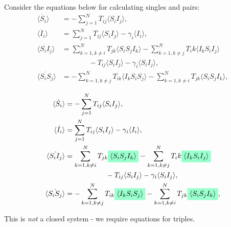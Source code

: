 \documentclass[unknownkeysallowed]{beamer}
\newcommand{\highlight}[1]{%
  \colorbox{highlight-colour}{$\displaystyle#1$}}
\begin{document}

\begin{frame}

Consider the equations below for calculating singles and pairs:
\begin{align*}
\langle \dot{S_i} \rangle & = -\sum^N_{j=1}T_{ij}\langle S_iI_j\rangle,\\
\langle\dot{I_i}\rangle & = \sum^N_{j=1}T_{ij}\langle S_iI_j\rangle - \gamma_i\langle I_i \rangle,\\
\langle\dot{S_iI_j}\rangle & = \sum^N_{k=1,k\neq i}T_{jk}\langle S_i S_j I_k \rangle - \sum^N_{k=1,k\neq j}T_ik\langle I_k S_i I_j \rangle \\ 
			    	      & ~~~~~~~~~~~~~~~~~- T_{ij}\langle S_iI_j \rangle - \gamma_i\langle S_i I_j \rangle,\\
\langle \dot{S_i S_j}\rangle & = - \sum^N_{k=1,k\neq j}T_{ik}\langle I_k S_i S_j \rangle - \sum^N_{k=1,k\neq i}T_{jk}\langle S_i S_j I_k \rangle,
\end{align*}

\end{frame}


\begin{frame}

\begin{align*}
\langle \dot{S_i} \rangle & = -\sum^N_{j=1}T_{ij}\langle S_iI_j\rangle,\\
\langle\dot{I_i}\rangle & = \sum^N_{j=1}T_{ij}\langle S_iI_j\rangle - \gamma_i\langle I_i \rangle,\\
\langle\dot{S_iI_j}\rangle & = \sum^N_{k=1,k\neq i}T_{jk}\highlight{\langle S_i S_j I_k \rangle} - \sum^N_{k=1,k\neq j}T_ik\highlight{\langle I_k S_i I_j \rangle} \\ 
			    	      & ~~~~~~~~~~~~~~~~~- T_{ij}\langle S_iI_j \rangle - \gamma_i\langle S_i I_j \rangle,\\
\langle \dot{S_i S_j}\rangle & = - \sum^N_{k=1,k\neq j}T_{ik}\highlight{\langle I_k S_i S_j \rangle} - \sum^N_{k=1,k\neq i}T_{jk}\highlight{\langle S_i S_j I_k \rangle},
\end{align*}

This is {\it not} a closed system - we require equations for triples.

\end{frame}

\end{document}
